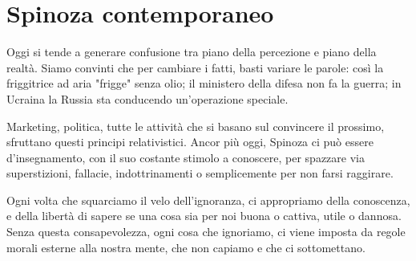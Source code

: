 \chapter{Spinoza contemporaneo}

Oggi si tende a generare confusione tra piano della percezione e piano della realtà. Siamo convinti che per cambiare i fatti, basti variare le parole: così la friggitrice ad aria "frigge" senza olio; il ministero della difesa non fa la guerra; in Ucraina la Russia sta conducendo un'operazione speciale.

Marketing, politica, tutte le attività che si basano sul convincere il prossimo, sfruttano questi principi relativistici. Ancor più oggi, Spinoza ci può essere d'insegnamento, con il suo costante stimolo a conoscere, per spazzare via superstizioni, fallacie, indottrinamenti o semplicemente per non farsi raggirare.

Ogni volta che squarciamo il velo dell'ignoranza, ci appropriamo della conoscenza, e della libertà di sapere se una cosa sia per noi buona o cattiva, utile o dannosa. Senza questa consapevolezza, ogni cosa che ignoriamo, ci viene imposta da regole morali esterne alla nostra mente, che non capiamo e che ci sottomettano.








\newpage